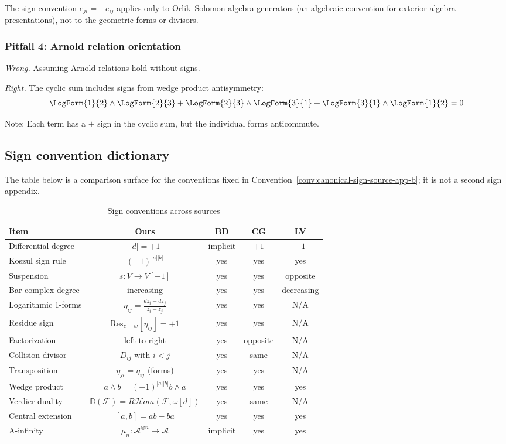 The sign convention $e_{ji} = -e_{ij}$ applies only to Orlik--Solomon algebra generators (an algebraic convention for exterior algebra presentations), not to the geometric forms or divisors.

\subsubsection{Pitfall 4: Arnold relation orientation}

\emph{Wrong.} Assuming Arnold relations hold without signs.

\emph{Right.} The cyclic sum includes signs from wedge product antisymmetry:
\[\LogForm{1}{2} \wedge \LogForm{2}{3} + \LogForm{2}{3} \wedge \LogForm{3}{1} + \LogForm{3}{1} \wedge \LogForm{1}{2} = 0\]

Note: Each term has a $+$ sign in the cyclic sum, but the individual forms anticommute.

\subsection{Sign convention dictionary}
\label{sec:sign-dictionary-complete}

The table below is a comparison surface for the conventions fixed in
Convention~\ref{conv:canonical-sign-source-app-b}; it is not a second
sign appendix.

\begin{table}[ht!]
\centering
\caption{Sign conventions across sources}
\label{tab:sign-conventions-complete}
\small
\begin{tabular}{|l|c|c|c|c|}
\hline
\textbf{Item} & \textbf{Ours} & \textbf{BD} & \textbf{CG} & \textbf{LV} \\
\hline
\hline
Differential degree & $|d| = +1$ & implicit & $+1$ & $-1$ \\
Koszul sign rule & $(-1)^{|a||b|}$ & yes & yes & yes \\
Suspension & $s: V \to V[-1]$ & yes & yes & opposite \\
Bar complex degree & increasing & yes & yes & decreasing \\
Logarithmic 1-forms & $\eta_{ij} = \frac{dz_i - dz_j}{z_i - z_j}$ & yes & yes & N/A \\
Residue sign & $\text{Res}_{z=w}[\eta_{ij}] = +1$ & yes & yes & N/A \\
Factorization & left-to-right & yes & opposite & N/A \\
Collision divisor & $D_{ij}$ with $i < j$ & yes & same & N/A \\
Transposition & $\eta_{ji} = \eta_{ij}$ (forms) & yes & yes & N/A \\
Wedge product & $a \wedge b = (-1)^{|a||b|} b \wedge a$ & yes & yes & yes \\
Verdier duality & $\mathbb{D}(\mathcal{F}) = R\mathcal{H}om(\mathcal{F}, \omega[d])$ & yes & same & N/A \\
Central extension & $[a,b] = ab - ba$ & yes & yes & yes \\
A-infinity & $\mu_n: \mathcal{A}^{\otimes n} \to \mathcal{A}$ & implicit & yes & yes \\
\hline
\end{tabular}
\end{table}

